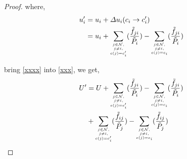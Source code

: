 \begin{appendices}
\begin{proof}
where,
\begin{equation}
\label{xxxx}
\begin{split}	
u_i'
& = u_i + \varDelta u_i(c_i\rightarrow c_i')\\
& = u_i + \sum\limits_{\tiny\substack{j\in\mathcal{N},\\j\neq i, \\c(j)=c_i'}}(\dfrac{\tilde f_{ji}}{\tilde P_i}) - \sum\limits_{\tiny\substack{j\in\mathcal{N},\\j\neq i, \\c(j)=c_i}}(\dfrac{\tilde f_{ji}}{\tilde P_i})
\end{split}
\end{equation}

bring \ref{xxxx} into \ref{xxx}, we get,
\begin{equation}
\label{xxxxx}
\begin{split}	
U'
& =U + \sum\limits_{\tiny\substack{j\in\mathcal{N},\\j\neq i, \\c(j)=c_i'}}(\dfrac{\tilde f_{ji}}{\tilde P_i}) - \sum\limits_{\tiny\substack{j\in\mathcal{N},\\j\neq i, \\c(j)=c_i}}(\dfrac{\tilde f_{ji}}{\tilde P_i}) \\
& + \sum\limits_{\tiny\substack{j\in\mathcal{N},\\j\neq i, \\c(j)=c_i'}}(\dfrac{\tilde f_{ij}}{\tilde P_j}) - \sum\limits_{\tiny\substack{j\in\mathcal{N},\\j\neq i, \\c(j)=c_i}}(\dfrac{\tilde f_{ij}}{\tilde P_j})\\

\end{split}
\end{equation}
\end{proof}
\end{appendices}

